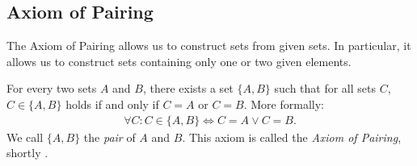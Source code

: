 \subsection{Axiom of Pairing}

The Axiom of Pairing allows us to construct sets from given sets. In particular, it allows us to construct sets containing only one or two given elements.

\begin{axiom}[Pairing]
    For every two sets $A$ and $B$, there exists a set $\{A,B\}$ such that for all sets $C$, $C\in\{A,B\}$ holds if and only if $C=A$ or $C=B$. More formally:
    \begin{align}\forall C\colon C\in\{A,B\}\Leftrightarrow C=A\lor C=B.\end{align}
    We call $\{A,B\}$ the \emph{pair} of $A$ and $B$. This axiom is called the \emph{Axiom of Pairing}, shortly .
\end{axiom}

